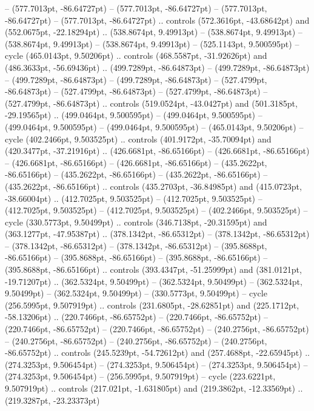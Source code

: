  -- (577.7013pt, -86.64727pt)
 -- (577.7013pt, -86.64727pt)
 -- (577.7013pt, -86.64727pt)
 -- (577.7013pt, -86.64727pt) .. controls (572.3616pt, -43.68642pt) and (552.0675pt, -22.18294pt) .. (538.8674pt, 9.49913pt)
 -- (538.8674pt, 9.49913pt)
 -- (538.8674pt, 9.49913pt)
 -- (538.8674pt, 9.49913pt)
 -- (525.1143pt, 9.500595pt) -- cycle
(465.0143pt, 9.50206pt) .. controls (468.5587pt, -31.92626pt) and (486.3633pt, -56.69436pt) .. (499.7289pt, -86.64873pt)
 -- (499.7289pt, -86.64873pt)
 -- (499.7289pt, -86.64873pt)
 -- (499.7289pt, -86.64873pt)
 -- (527.4799pt, -86.64873pt)
 -- (527.4799pt, -86.64873pt)
 -- (527.4799pt, -86.64873pt)
 -- (527.4799pt, -86.64873pt) .. controls (519.0524pt, -43.0427pt) and (501.3185pt, -29.19565pt) .. (499.0464pt, 9.500595pt)
 -- (499.0464pt, 9.500595pt)
 -- (499.0464pt, 9.500595pt)
 -- (499.0464pt, 9.500595pt)
 -- (465.0143pt, 9.50206pt) -- cycle
(402.2466pt, 9.503525pt) .. controls (401.9172pt, -35.70094pt) and (420.3477pt, -37.21916pt) .. (426.6681pt, -86.65166pt)
 -- (426.6681pt, -86.65166pt)
 -- (426.6681pt, -86.65166pt)
 -- (426.6681pt, -86.65166pt)
 -- (435.2622pt, -86.65166pt)
 -- (435.2622pt, -86.65166pt)
 -- (435.2622pt, -86.65166pt)
 -- (435.2622pt, -86.65166pt) .. controls (435.2703pt, -36.84985pt) and (415.0723pt, -38.66004pt) .. (412.7025pt, 9.503525pt)
 -- (412.7025pt, 9.503525pt)
 -- (412.7025pt, 9.503525pt)
 -- (412.7025pt, 9.503525pt)
 -- (402.2466pt, 9.503525pt) -- cycle
(330.5773pt, 9.50499pt) .. controls (346.7138pt, -20.31595pt) and (363.1277pt, -47.95387pt) .. (378.1342pt, -86.65312pt)
 -- (378.1342pt, -86.65312pt)
 -- (378.1342pt, -86.65312pt)
 -- (378.1342pt, -86.65312pt)
 -- (395.8688pt, -86.65166pt)
 -- (395.8688pt, -86.65166pt)
 -- (395.8688pt, -86.65166pt)
 -- (395.8688pt, -86.65166pt) .. controls (393.4347pt, -51.25999pt) and (381.0121pt, -19.71207pt) .. (362.5324pt, 9.50499pt)
 -- (362.5324pt, 9.50499pt)
 -- (362.5324pt, 9.50499pt)
 -- (362.5324pt, 9.50499pt)
 -- (330.5773pt, 9.50499pt) -- cycle
(256.5995pt, 9.507919pt) .. controls (231.6805pt, -28.62851pt) and (225.1712pt, -58.13206pt) .. (220.7466pt, -86.65752pt)
 -- (220.7466pt, -86.65752pt)
 -- (220.7466pt, -86.65752pt)
 -- (220.7466pt, -86.65752pt)
 -- (240.2756pt, -86.65752pt)
 -- (240.2756pt, -86.65752pt)
 -- (240.2756pt, -86.65752pt)
 -- (240.2756pt, -86.65752pt) .. controls (245.5239pt, -54.72612pt) and (257.4688pt, -22.65945pt) .. (274.3253pt, 9.506454pt)
 -- (274.3253pt, 9.506454pt)
 -- (274.3253pt, 9.506454pt)
 -- (274.3253pt, 9.506454pt)
 -- (256.5995pt, 9.507919pt) -- cycle
(223.6221pt, 9.507919pt) .. controls (217.021pt, -1.631805pt) and (219.3862pt, -12.33569pt) .. (219.3287pt, -23.23373pt)
